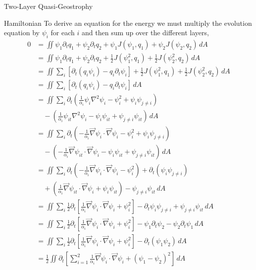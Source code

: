 \documentclass[12pt]{article}
\begin{document}
\begin{section}{Two-Layer Quasi-Geostrophy}
    \begin{subsection}{Hamiltonian}
        To derive an equation for the energy we must multiply the evolution equation by $\psi_i$ for each $i$ and then sum up over the different layers,
        \begin{align*}
            0 &= \iint \psi_1 \partial_t q_1 + \psi_2 \partial_t q_2 + \psi_1 J(\psi_1, q_1) + \psi_2 J(\psi_2, q_2) \, dA \\
            &= \iint \psi_1 \partial_t q_1 + \psi_2 \partial_t q_2 + \frac12 J(\psi_1^2, q_1) + \frac12 J(\psi_2^2, q_2) \, dA \\
            &= \iint \sum_i \left[\partial_t(q_i \psi_i) - q_i \partial_t\psi_i \right] + \frac12 J(\psi_1^2, q_1) + \frac12 J(\psi_2^2, q_2) \, dA \\
            &= \iint \sum_i \left[\partial_t(q_i \psi_i) - q_i \partial_t\psi_i \right] \, dA \\
            &= \iint \sum_i \partial_t \left (\frac{1}{\alpha_i}\psi_i \nabla^2 \psi_i - \psi_i^2 + \psi_i\psi_{j\ne i} \right) \\
            &\quad - \left( \frac{1}{\alpha_i} \psi_{it} \nabla^2 \psi_i - \psi_i \psi_{it} + \psi_{j \ne i} \psi_{it} \right) \, dA \\
            &= \iint \sum_i \partial_t \left (-\frac{1}{\alpha_i} \vec\nabla \psi_i \cdot \vec\nabla \psi_i - \psi_i^2 + \psi_i\psi_{j\ne i} \right) \\
            &\quad - \left( -\frac{1}{\alpha_i} \vec\nabla \psi_{it} \cdot \vec\nabla \psi_i - \psi_i \psi_{it} + \psi_{j \ne i} \psi_{it} \right) \, dA \\
            &= \iint \sum_i \partial_t \left (-\frac{1}{\alpha_i} \vec\nabla \psi_i \cdot \vec\nabla \psi_i - \psi_i^2 \right) + \partial_t (\psi_i\psi_{j\ne i})  \\
            &\quad + \left( \frac{1}{\alpha_i} \vec\nabla \psi_{it} \cdot \vec\nabla \psi_i + \psi_i \psi_{it} \right) - \psi_{j \ne i} \psi_{it} \, dA \\
            &= \iint \sum_i \frac12 \partial_t \left[ \frac{1}{\alpha_i} \vec\nabla \psi_i \cdot \vec\nabla \psi_i + \psi_i^2 \right] - \partial_t \psi_i\psi_{j\ne i} + \psi_{j \ne i} \psi_{it} \, dA \\
            &= \iint  \sum_i \frac12 \partial_t \left[ \frac{1}{\alpha_i} \vec\nabla \psi_i \cdot  \vec\nabla \psi_i + \psi_i^2 \right] - \psi_1 \partial_t \psi_2  -  \psi_2 \partial_t \psi_1\, dA \\
            &= \iint  \sum_i \frac12 \partial_t \left[ \frac{1}{\alpha_i} \vec\nabla \psi_i \cdot  \vec\nabla \psi_i + \psi_i^2 \right] -  \partial_t (\psi_1\psi_2)\, dA \\
            &= \frac12 \iint \partial_t \left[ \sum_{i=1}^2 \frac{1}{\alpha_i} \vec\nabla \psi_i \cdot \vec\nabla \psi_i + (\psi_1 - \psi_2)^2 \right]\, dA
        \end{align*}


\end{subsection}
\end{section}
\end{document}
